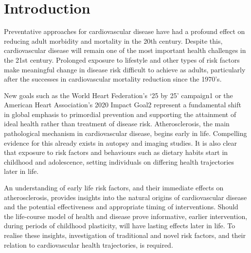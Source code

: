 \section{Introduction}
Preventative approaches for cardiovascular disease have had a profound effect on reducing adult morbidity and mortality in the 20th century. Despite this, cardiovascular disease will remain one of the most important health challenges in the 21st century. Prolonged exposure to lifestyle and other types of risk factors make meaningful change in disease risk difficult to achieve as adults, particularly after the successes in cardiovascular mortality reduction since the 1970’s.

New goals such as the World Heart Federation’s ‘25 by 25’ campaign1 or the American Heart Association’s 2020 Impact Goal2 represent a fundamental shift in global emphasis to primordial prevention and supporting the attainment of ideal health rather than treatment of disease risk.
Atherosclerosis, the main pathological mechanism in cardiovascular disease, begins early in life. Compelling evidence for this already exists in autopsy and imaging studies. It is also clear that exposure to risk factors and behaviours such as dietary habits start in childhood and adolescence, setting individuals on differing health trajectories later in life. 

An understanding of early life risk factors, and their immediate effects on atherosclerosis, provides insights into the natural origins of cardiovascular disease and the potential effectiveness and appropriate timing of interventions. Should the life-course model of health and disease prove informative, earlier intervention, during periods of childhood plasticity, will have lasting effects later in life. To realise these insights, investigation of traditional and novel risk factors, and their relation to cardiovascular health trajectories, is required. 
